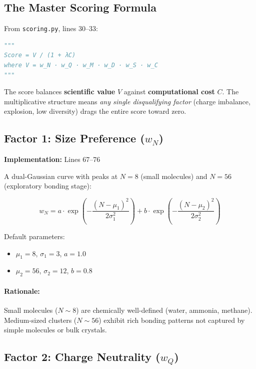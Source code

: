 \documentclass[11pt]{article}
\begin{document}
\subsection{The Master Scoring Formula}

From \texttt{scoring.py}, lines 30--33:

\begin{lstlisting}[language=Python]
"""
Score = V / (1 + λC)
where V = w_N · w_Q · w_M · w_D · w_S · w_C
"""
\end{lstlisting}

The score balances \textbf{scientific value} $V$ against \textbf{computational cost} $C$. The multiplicative structure means \textit{any single disqualifying factor} (charge imbalance, explosion, low diversity) drags the entire score toward zero.

\subsection{Factor 1: Size Preference ($w_N$)}

\textbf{Implementation:} Lines 67--76

A dual-Gaussian curve with peaks at $N = 8$ (small molecules) and $N = 56$ (exploratory bonding stage):

\begin{equation}
w_N = a \cdot \exp\!\left(-\frac{(N - \mu_1)^2}{2\sigma_1^2}\right) + b \cdot \exp\!\left(-\frac{(N - \mu_2)^2}{2\sigma_2^2}\right)
\end{equation}

Default parameters:
\begin{itemize}
\item $\mu_1 = 8$, $\sigma_1 = 3$, $a = 1.0$
\item $\mu_2 = 56$, $\sigma_2 = 12$, $b = 0.8$
\end{itemize}

\paragraph{Rationale:} Small molecules ($N \sim 8$) are chemically well-defined (water, ammonia, methane). Medium-sized clusters ($N \sim 56$) exhibit rich bonding patterns not captured by simple molecules or bulk crystals.

\subsection{Factor 2: Charge Neutrality ($w_Q$)}
\end{document}
